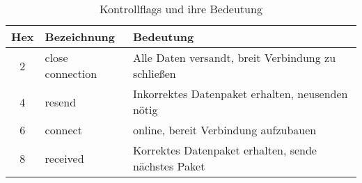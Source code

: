 \vspace{0.5cm}
\begin{table}[H]
    \center
    \def\arraystretch{1.3}
    \begin{tabular}{|c|l|l|}
        \rowcolor{gray!50}
        \hline
        \textbf{Hex} & \textbf{Bezeichnung} & \textbf{Bedeutung}                                  \\
        \hline
        2            & close connection     & Alle Daten versandt, breit Verbindung zu schließen  \\
        4            & resend               & Inkorrektes Datenpaket erhalten, neusenden nötig    \\
        6            & connect              & online, bereit Verbindung aufzubauen                \\
        8            & received             & Korrektes Datenpaket erhalten, sende nächstes Paket \\
        \hline
    \end{tabular}
    \caption{Kontrollflags und ihre Bedeutung}
    \label{tab:control_flags}
\end{table}